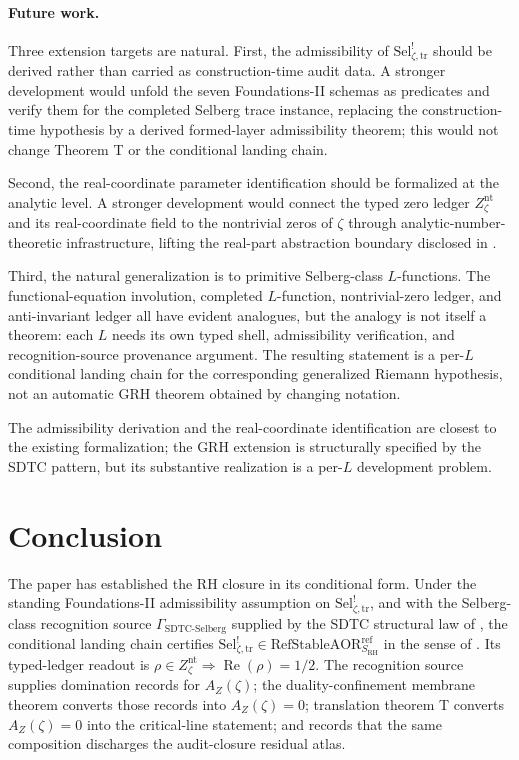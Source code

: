 \documentclass[11pt]{article}
\DeclareMathOperator{\Real}{Re}
\newcommand{\Znt}{Z_{\zeta}^{\mathrm{nt}}}
\newcommand{\AZ}{A_{Z}(\zeta)}
\newcommand{\Sel}{\mathrm{Sel}^{!}_{\zeta,\mathrm{tr}}}
\newcommand{\GamSDTCSelberg}{\Gamma_{\mathrm{SDTC\text{-}Selberg}}}
\theoremstyle{definition}
\begin{document}
\paragraph{Future work.}
Three extension targets are natural.  First, the admissibility of
\(\Sel\) should be derived rather than carried as construction-time
audit data.  A stronger development would unfold the seven
Foundations-II schemas as predicates and verify them for the
completed Selberg trace instance, replacing the construction-time
hypothesis by a derived formed-layer admissibility theorem; this
would not change Theorem T or the conditional landing chain.

Second, the real-coordinate parameter identification should be
formalized at the analytic level.  A stronger development would
connect the typed zero ledger \(\Znt\) and its real-coordinate
field to the nontrivial zeros of \(\zeta\) through
analytic-number-theoretic infrastructure, lifting the real-part
abstraction boundary disclosed in .

Third, the natural generalization is to primitive Selberg-class
\(L\)-functions.  The functional-equation involution, completed
\(L\)-function, nontrivial-zero ledger, and anti-invariant ledger
all have evident analogues, but the analogy is not itself a
theorem: each \(L\) needs its own typed shell, admissibility
verification, and recognition-source provenance argument.  The
resulting statement is a per-\(L\) conditional landing chain for
the corresponding generalized Riemann hypothesis, not an automatic
GRH theorem obtained by changing notation.

The admissibility derivation and the real-coordinate identification
are closest to the existing formalization; the GRH extension is
structurally specified by the SDTC pattern, but its substantive
realization is a per-\(L\) development problem.
 

\section{Conclusion}
\label{sec:conclusion}

The paper has established the RH closure in its conditional form.
Under the standing Foundations-II admissibility assumption on
\(\Sel\), and with the Selberg-class recognition source
\(\GamSDTCSelberg\) supplied by the SDTC structural law of
\citet{TsiokosSDTC2026}, the conditional landing chain certifies
\(\Sel\in\mathrm{RefStableAOR}^{\mathrm{ref}}_{S_{\mathrm{RH}}}\)
in the sense of \citet{TsiokosAOR2026}.  Its typed-ledger readout is
\(\rho\in\Znt \Rightarrow \Real(\rho)=1/2\).  The recognition source
supplies domination records for \(\AZ\); the duality-confinement
membrane theorem converts those records into \(\AZ=0\); translation
theorem T converts \(\AZ=0\) into the critical-line statement; and
 records that the same composition
discharges the audit-closure residual atlas.
\end{document}
